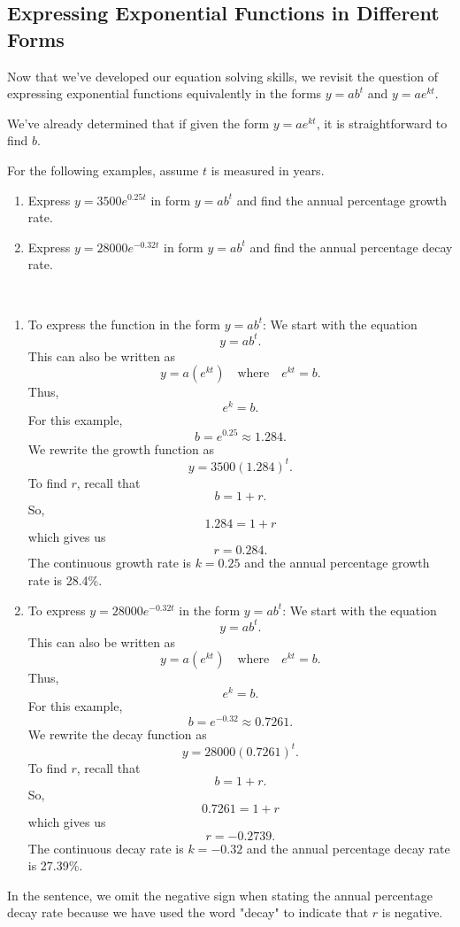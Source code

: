 \subsection{Expressing Exponential Functions in Different Forms}

Now that we’ve developed our equation solving skills, we revisit the question of expressing exponential functions equivalently in the forms $y = ab^t$ and $y = ae^{kt}$.

We’ve already determined that if given the form $y = ae^{kt}$, it is straightforward to find $b$.

\begin{example}
    For the following examples, assume $t$ is measured in years.
    \begin{enumerate}
        \item Express $y = 3500 e^{0.25t}$ in form $y = ab^t$ and find the annual percentage growth rate.
        \item Express $y = 28000 e^{-0.32t}$ in form $y = ab^t$ and find the annual percentage decay rate.
    \end{enumerate}
\end{example}

\begin{solution}~
    \begin{enumerate}
        \item To express the function in the form \(y = ab^t\):
              We start with the equation
              \[ y = ab^t. \]
              This can also be written as
              \[ y = a(e^{kt}) \quad \text{where} \quad e^{kt} = b. \]
              Thus,
              \[ e^k = b. \]
              For this example,
              \[ b = e^{0.25} \approx 1.284. \]
              We rewrite the growth function as
              \[ y = 3500(1.284)^t. \]
              To find \(r\), recall that
              \[ b = 1+r. \]
              So,
              \[ 1.284 = 1+r \]
              which gives us
              \[ r = 0.284. \]
              The continuous growth rate is \(k = 0.25\) and the annual percentage growth rate is 28.4\%.

        \item To express \(y = 28000 e^{-0.32t}\) in the form \(y = ab^t\):
              We start with the equation
              \[ y = ab^t. \]
              This can also be written as
              \[ y = a(e^{kt}) \quad \text{where} \quad e^{kt} = b. \]
              Thus,
              \[ e^k = b. \]
              For this example,
              \[ b = e^{-0.32} \approx 0.7261. \]
              We rewrite the decay function as
              \[ y = 28000(0.7261)^t. \]
              To find \(r\), recall that
              \[ b = 1+r. \]
              So,
              \[ 0.7261 = 1+r \]
              which gives us
              \[ r = -0.2739. \]
              The continuous decay rate is \(k = -0.32\) and the annual percentage decay rate is 27.39\%.
    \end{enumerate}
    In the sentence, we omit the negative sign when stating the annual percentage decay rate because we have used the word "decay" to indicate that \(r\) is negative.
\end{solution}

